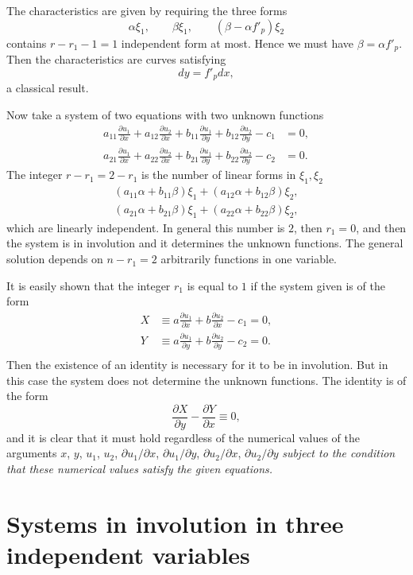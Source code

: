 \documentclass[leqno,11pt]{article}
\newcommand{\pd}{\partial}
\theoremstyle{shape1}
\theoremstyle{shape0}
\theoremstyle{shape2}
\theoremstyle{definition}
\begin{document}
The characteristics are given by requiring the three forms
\[
\alpha\xi_{1},\qquad\beta\xi_{1},\qquad(\beta-\alpha f'_{p})\xi_{2}
\]
contains $r-r_{1}-1=1$ independent form at most. Hence we must have $\beta=\alpha f'_{p}$. Then the characteristics are curves satisfying
\[
dy=f'_{p}dx,
\]
a classical result.

Now take a system of two equations with two unknown functions
\begin{align*}
  a_{11}\frac{\pd u_{1}}{\pd x}+a_{12}\frac{\pd u_{2}}{\pd x}+b_{11}\frac{\pd u_{1}}{\pd y}+b_{12}\frac{\pd u_{2}}{\pd y}-c_{1}&=0,\\
  a_{21}\frac{\pd u_{1}}{\pd x}+a_{22}\frac{\pd u_{2}}{\pd x}+b_{21}\frac{\pd u_{1}}{\pd y}+b_{22}\frac{\pd u_{2}}{\pd y}-c_{2}&=0.
\end{align*}
The integer $r-r_{1}=2-r_{1}$ is the number of linear forms in $\xi_{1},\xi_{2}$
\begin{gather*}
  (a_{11}\alpha+b_{11}\beta)\xi_{1}+(a_{12}\alpha+b_{12}\beta)\xi_{2},\\
  (a_{21}\alpha+b_{21}\beta)\xi_{1}+(a_{22}\alpha+b_{22}\beta)\xi_{2},
\end{gather*}
which are linearly independent. In general this number is $2$, then $r_{1}=0$, and then the system is in involution and it determines the unknown functions. The general solution depends on $n-r_{1}=2$ arbitrarily functions in one variable.

It is easily shown that the integer $r_{1}$ is equal to $1$ if the system given is of the form
\begin{align*}
  X&\equiv a\frac{\pd u_{1}}{\pd x}+b\frac{\pd u_{2}}{\pd x}-c_{1}=0,\\
  Y&\equiv a\frac{\pd u_{1}}{\pd y}+b\frac{\pd u_{2}}{\pd y}-c_{2}=0.\\  
\end{align*}
Then the existence of an identity is necessary for it to be in involution. But in this case the system does not determine the unknown functions. The identity is of the form
\[
\frac{\pd X}{\pd y}-\frac{\pd Y}{\pd x}\equiv 0,
\]
and it is clear that it must hold regardless of the numerical values of the arguments $x$, $y$, $u_{1}$, $u_{2}$, $\pd u_{1}/\pd x$, $\pd u_{1}/\pd y$, $\pd u_{2}/\pd x$, $\pd u_{2}/\pd y$ \emph{subject to the condition that these numerical values satisfy the given equations.}


\section{Systems in involution in three independent variables}
\label{sec:syst-invol-three}
\end{document}
